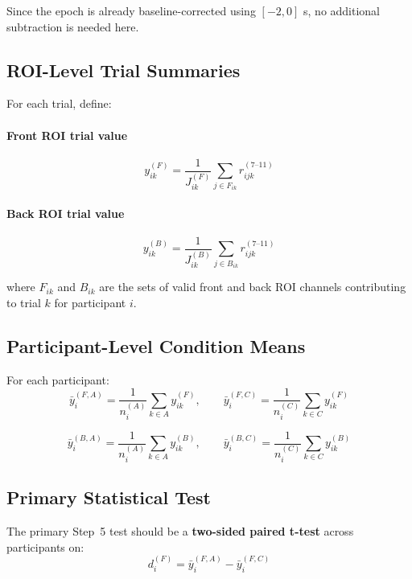 \documentclass[11pt]{article}
\begin{document}
Since the epoch is already baseline-corrected using \([-2,0]\) s, no additional subtraction is needed here.

\subsection{ROI-Level Trial Summaries}
For each trial, define:

\paragraph{Front ROI trial value}
\begin{equation}
y^{(F)}_{ik}
=
\frac{1}{J^{(F)}_{ik}}
\sum_{j \in F_{ik}} r^{(7\text{--}11)}_{ijk}
\end{equation}

\paragraph{Back ROI trial value}
\begin{equation}
y^{(B)}_{ik}
=
\frac{1}{J^{(B)}_{ik}}
\sum_{j \in B_{ik}} r^{(7\text{--}11)}_{ijk}
\end{equation}

where \(F_{ik}\) and \(B_{ik}\) are the sets of valid front and back ROI channels contributing
to trial \(k\) for participant \(i\).

\subsection{Participant-Level Condition Means}
For each participant:
\begin{equation}
\bar{y}^{(F,A)}_i
=
\frac{1}{n_i^{(A)}}
\sum_{k \in A} y^{(F)}_{ik},
\qquad
\bar{y}^{(F,C)}_i
=
\frac{1}{n_i^{(C)}}
\sum_{k \in C} y^{(F)}_{ik}
\end{equation}

\begin{equation}
\bar{y}^{(B,A)}_i
=
\frac{1}{n_i^{(A)}}
\sum_{k \in A} y^{(B)}_{ik},
\qquad
\bar{y}^{(B,C)}_i
=
\frac{1}{n_i^{(C)}}
\sum_{k \in C} y^{(B)}_{ik}
\end{equation}

\subsection{Primary Statistical Test}
The primary Step~5 test should be a \textbf{two-sided paired t-test} across participants on:
\begin{equation}
d^{(F)}_i = \bar{y}^{(F,A)}_i - \bar{y}^{(F,C)}_i
\end{equation}
\end{document}
